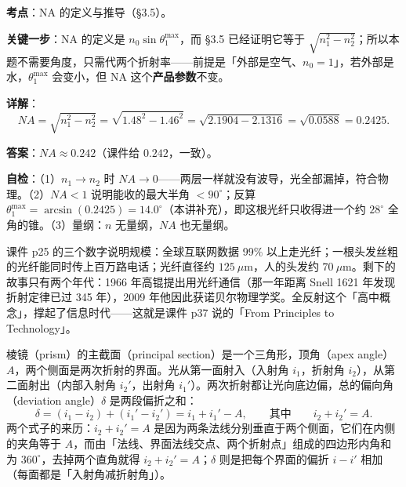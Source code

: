 \documentclass[11pt]{ctexart}
\begin{document}
\Needspace*{0.34\textheight}
\textbf{考点}：NA 的定义与推导（§3.5）。

\textbf{关键一步}：NA 的定义是 $n_0\sin\theta_1^{\max}$，而 §3.5 已经证明它等于 $\sqrt{n_1^2-n_2^2}$；所以本题不需要角度，只需代两个折射率——前提是「外部是空气、$n_0=1$」，若外部是水，$\theta_1^{\max}$ 会变小，但 NA 这个\textbf{产品参数}不变。

\textbf{详解}：
\[
NA=\sqrt{n_1^2-n_2^2}=\sqrt{1.48^2-1.46^2}
=\sqrt{2.1904-2.1316}=\sqrt{0.0588}=0.2425 .
\]

\textbf{答案}：$NA\approx0.242$（课件给 $0.242$，一致）。

\textbf{自检}：（1）$n_1\to n_2$ 时 $NA\to0$——两层一样就没有波导，光全部漏掉，符合物理。（2）$NA<1$ 说明能收的最大半角 $<90^\circ$；反算 $\theta_1^{\max}=\arcsin(0.2425)=14.0^\circ$（本讲补充），即这根光纤只收得进一个约 $28^\circ$ 全角的锥。（3）量纲：$n$ 无量纲，$NA$ 也无量纲。

课件 p25 的三个数字说明规模：全球互联网数据 99\% 以上走光纤；一根头发丝粗的光纤能同时传上百万路电话；光纤直径约 $125\ \mu$m，人的头发约 $70\ \mu$m。剩下的故事只有两个年代：1966 年高锟提出用光纤通信（那一年距离 Snell 1621 年发现折射定律已过 345 年），2009 年他因此获诺贝尔物理学奖。全反射这个「高中概念」，撑起了信息时代——这就是课件 p37 说的「From Principles to Technology」。


棱镜（prism）的主截面（principal section）是一个三角形，顶角（apex angle）$A$，两个侧面是两次折射的界面。光从第一面射入（入射角 $i_1$，折射角 $i_2$），从第二面射出（内部入射角 $i_2'$，出射角 $i_1'$）。两次折射都让光向底边偏，总的偏向角（deviation angle）$\delta$ 是两段偏折之和：
\[
\delta=(i_1-i_2)+(i_1'-i_2')=i_1+i_1'-A,
\qquad\text{其中}\qquad i_2+i_2'=A .
\]
两个式子的来历：$i_2+i_2'=A$ 是因为两条法线分别垂直于两个侧面，它们在内侧的夹角等于 $A$，而由「法线、界面法线交点、两个折射点」组成的四边形内角和为 $360^\circ$，去掉两个直角就得 $i_2+i_2'=A$；$\delta$ 则是把每个界面的偏折 $i-i'$ 相加（每面都是「入射角减折射角」）。
\end{document}
